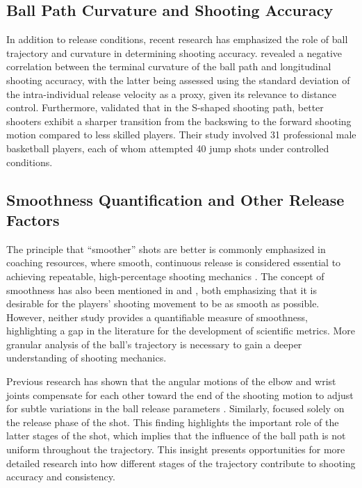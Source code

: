 \documentclass[Review,sageh,times,doublespace]{sagej}
\begin{document}
    \subsection{Ball Path Curvature and Shooting Accuracy}
    
      In addition to release conditions, recent research has emphasized the role of ball trajectory and curvature in determining shooting accuracy. \citet{slegers_role_2024} revealed a negative correlation between the terminal curvature of the ball path and longitudinal shooting accuracy, with the latter being assessed using the standard deviation of the intra-individual release velocity as a proxy, given its relevance to distance control. Furthermore, \citet{slegers_role_2024} validated that in the S-shaped shooting path, better shooters exhibit a sharper transition from the backswing to the forward shooting motion compared to less skilled players. Their study involved 31 professional male basketball players, each of whom attempted 40 jump shots under controlled conditions. 

    \subsection{Smoothness Quantification and Other Release Factors}

      The principle that ``smoother'' shots are better is commonly emphasized in coaching resources, where smooth, continuous release is considered essential to achieving repeatable, high-percentage shooting mechanics \citep{haefner_7_2010, penny_overlooked_2016}. The concept of smoothness has also been mentioned in \citet{pakosz_muscle_2021} and \citet{tran_optimal_2008}, both emphasizing that it is desirable for the players' shooting movement to be as smooth as possible. However, neither study provides a quantifiable measure of smoothness, highlighting a gap in the literature for the development of scientific metrics. More granular analysis of the ball’s trajectory is necessary to gain a deeper understanding of shooting mechanics.

      Previous research has shown that the angular motions of the elbow and wrist joints compensate for each other toward the end of the shooting motion to adjust for subtle variations in the ball release parameters \citep{button_examining_2003}. Similarly, \citet{tran_optimal_2008} focused solely on the release phase of the shot. This finding highlights the important role of the latter stages of the shot, which implies that the influence of the ball path is not uniform throughout the trajectory. This insight presents opportunities for more detailed research into how different stages of the trajectory contribute to shooting accuracy and consistency.
\end{document}
